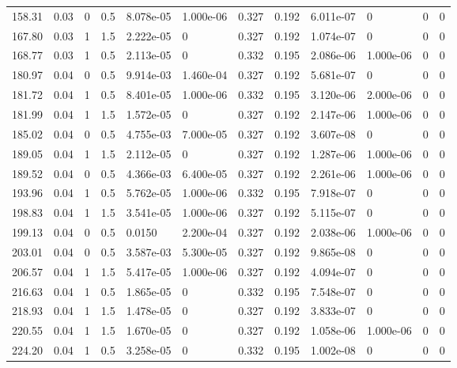 \documentclass[preview]{standalone}
\begin{document}
{{\begin{tabular}{L{1.2cm}C{1.2cm} C{0.3cm}C{0.5cm} C{1.4cm}C{1.4cm} C{1.4cm}C{1.4cm} C{1.6cm}C{1.6cm} C{1.6cm}C{1.6cm}}
  158.31  &  0.03  & 0     & 0.5 &  8.078e-05  & 1.000e-06  &  0.327&   0.192& 6.011e-07 & 0   &  0 & 0  \\ 
  167.80  &  0.03  & 1     & 1.5 &  2.222e-05  & 0  &  0.327&   0.192& 1.074e-07 & 0   &  0 & 0  \\ 
  168.77  &  0.03  & 1     & 0.5 &  2.113e-05  & 0  &  0.332&   0.195& 2.086e-06 & 1.000e-06   &  0 & 0  \\ 
  180.97  &  0.04  & 0     & 0.5 &  9.914e-03  & 1.460e-04  &  0.327&   0.192& 5.681e-07 & 0   &  0 & 0  \\ 
  181.72  &  0.04  & 1     & 0.5 &  8.401e-05  & 1.000e-06  &  0.332&   0.195& 3.120e-06 & 2.000e-06   &  0 & 0  \\ 
  181.99  &  0.04  & 1     & 1.5 &  1.572e-05  & 0  &  0.327&   0.192& 2.147e-06 & 1.000e-06   &  0 & 0  \\ 
  185.02  &  0.04  & 0     & 0.5 &  4.755e-03  & 7.000e-05  &  0.327&   0.192& 3.607e-08 & 0   &  0 & 0  \\ 
  189.05  &  0.04  & 1     & 1.5 &  2.112e-05  & 0  &  0.327&   0.192& 1.287e-06 & 1.000e-06   &  0 & 0  \\ 
  189.52  &  0.04  & 0     & 0.5 &  4.366e-03  & 6.400e-05  &  0.327&   0.192& 2.261e-06 & 1.000e-06   &  0 & 0  \\ 
  193.96  &  0.04  & 1     & 0.5 &  5.762e-05  & 1.000e-06  &  0.332&   0.195& 7.918e-07 & 0   &  0 & 0  \\ 
  198.83  &  0.04  & 1     & 1.5 &  3.541e-05  & 1.000e-06  &  0.327&   0.192& 5.115e-07 & 0   &  0 & 0  \\ 
  199.13  &  0.04  & 0     & 0.5 &  0.0150  & 2.200e-04  &  0.327&   0.192& 2.038e-06 & 1.000e-06   &  0 & 0  \\ 
  203.01  &  0.04  & 0     & 0.5 &  3.587e-03  & 5.300e-05  &  0.327&   0.192& 9.865e-08 & 0   &  0 & 0  \\ 
  206.57  &  0.04  & 1     & 1.5 &  5.417e-05  & 1.000e-06  &  0.327&   0.192& 4.094e-07 & 0   &  0 & 0  \\ 
  216.63  &  0.04  & 1     & 0.5 &  1.865e-05  & 0  &  0.332&   0.195& 7.548e-07 & 0   &  0 & 0  \\ 
  218.93  &  0.04  & 1     & 1.5 &  1.478e-05  & 0  &  0.327&   0.192& 3.833e-07 & 0   &  0 & 0  \\ 
  220.55  &  0.04  & 1     & 1.5 &  1.670e-05  & 0  &  0.327&   0.192& 1.058e-06 & 1.000e-06   &  0 & 0  \\ 
  224.20  &  0.04  & 1     & 0.5 &  3.258e-05  & 0  &  0.332&   0.195& 1.002e-08 & 0   &  0 & 0  \\ 

\end{tabular}}}
\end{document}
